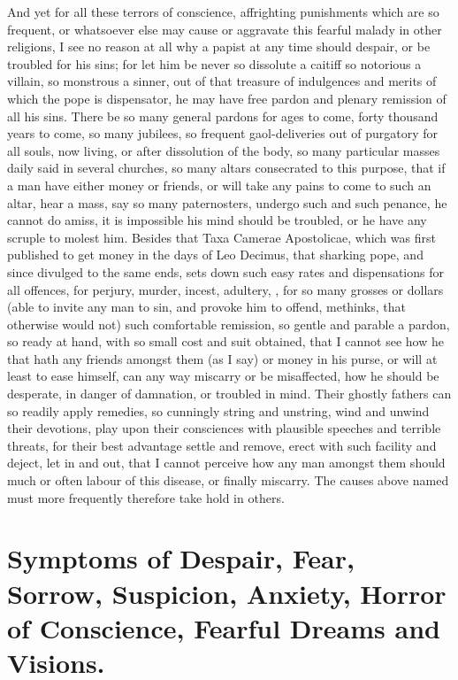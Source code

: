 {And yet for all these terrors of conscience, affrighting punishments
which are so frequent, or whatsoever else may cause or aggravate this
fearful malady in other religions, I see no reason at all why a papist
at any time should despair, or be troubled for his sins; for let him be
never so dissolute a caitiff so notorious a villain, so monstrous a
sinner, out of that treasure of indulgences and merits of which the
pope is dispensator, he may have free pardon and plenary remission of
all his sins. There be so many general pardons for ages to come, forty
thousand years to come, so many jubilees, so frequent gaol-deliveries
out of purgatory for all souls, now living, or after dissolution of the
body, so many particular masses daily said in several churches, so many
altars consecrated to this purpose, that if a man have either money or
friends, or will take any pains to come to such an altar, hear a mass,
say so many paternosters, undergo such and such penance, he cannot do
amiss, it is impossible his mind should be troubled, or he have any
scruple to molest him. Besides that Taxa Camerae Apostolicae, which was
first published to get money in the days of Leo Decimus, that sharking
pope, and since divulged to the same ends, sets down such easy rates
and dispensations for all offences, for perjury, murder, incest,
adultery, \etc{}, for so many grosses or dollars (able to invite any man
to sin, and provoke him to offend, methinks, that otherwise would not)
such comfortable remission, so gentle and parable a pardon, so ready at
hand, with so small cost and suit obtained, that I cannot see how he
that hath any friends amongst them (as I say) or money in his purse, or
will at least to ease himself, can any way miscarry or be misaffected,
how he should be desperate, in danger of damnation, or troubled in
mind. Their ghostly fathers can so readily apply remedies, so cunningly
string and unstring, wind and unwind their devotions, play upon their
consciences with plausible speeches and terrible threats, for their
best advantage settle and remove, erect with such facility and deject,
let in and out, that I cannot perceive how any man amongst them should
much or often labour of this disease, or finally miscarry. The causes
above named must more frequently therefore take hold in others.

\section[Symptoms of Despair]{Symptoms of Despair, Fear, Sorrow, Suspicion, Anxiety, Horror of Conscience, Fearful Dreams and Visions.}

}
